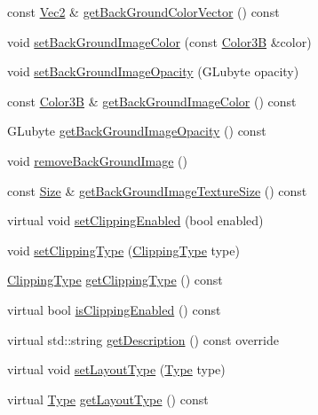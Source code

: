 \begin{DoxyCompactItemize}
\item 
const \hyperlink{classVec2}{Vec2} \& \hyperlink{classui_1_1Layout_a940e42417f3342d05b69c7526fd9c547}{get\+Back\+Ground\+Color\+Vector} () const
\item 
void \hyperlink{classui_1_1Layout_acad2194099548020e1fe05c4c358c2fb}{set\+Back\+Ground\+Image\+Color} (const \hyperlink{structColor3B}{Color3B} \&color)
\item 
void \hyperlink{classui_1_1Layout_a736ea1d892fa9343b03a3c6a1b92ac38}{set\+Back\+Ground\+Image\+Opacity} (G\+Lubyte opacity)
\item 
const \hyperlink{structColor3B}{Color3B} \& \hyperlink{classui_1_1Layout_a8f96b431d9a430fcf3692cf927c0e4c6}{get\+Back\+Ground\+Image\+Color} () const
\item 
G\+Lubyte \hyperlink{classui_1_1Layout_af77ed069ce97332a6baab5fe81bfef2d}{get\+Back\+Ground\+Image\+Opacity} () const
\item 
void \hyperlink{classui_1_1Layout_a5ccd3cef17fe9ae4ed0d76f2d07a96ce}{remove\+Back\+Ground\+Image} ()
\item 
const \hyperlink{classSize}{Size} \& \hyperlink{classui_1_1Layout_a1c09df045301db369c921da53b6a3f16}{get\+Back\+Ground\+Image\+Texture\+Size} () const
\item 
virtual void \hyperlink{classui_1_1Layout_a53ebd3db75c794eb07386377b9dc6edd}{set\+Clipping\+Enabled} (bool enabled)
\item 
void \hyperlink{classui_1_1Layout_aed2e7279ffe4d9fda5820917a36b71db}{set\+Clipping\+Type} (\hyperlink{classui_1_1Layout_acd2a398e83d7d467e9565d4db171c865}{Clipping\+Type} type)
\item 
\hyperlink{classui_1_1Layout_acd2a398e83d7d467e9565d4db171c865}{Clipping\+Type} \hyperlink{classui_1_1Layout_a015458636724242eff0c903363121c63}{get\+Clipping\+Type} () const
\item 
virtual bool \hyperlink{classui_1_1Layout_a6c82db84c36bfb19462616bc2a691e5c}{is\+Clipping\+Enabled} () const
\item 
virtual std\+::string \hyperlink{classui_1_1Layout_abab3763418d0b11bb800c68aed425afd}{get\+Description} () const override
\item 
virtual void \hyperlink{classui_1_1Layout_a3b9f71278c331fd042b9634e1a654fce}{set\+Layout\+Type} (\hyperlink{classui_1_1Layout_aecabbc1592677eadd6757edc1df5b952}{Type} type)
\item 
virtual \hyperlink{classui_1_1Layout_aecabbc1592677eadd6757edc1df5b952}{Type} \hyperlink{classui_1_1Layout_a4b2cf55b05b21bc57aa4ce0da286f149}{get\+Layout\+Type} () const

\end{DoxyCompactItemize}
